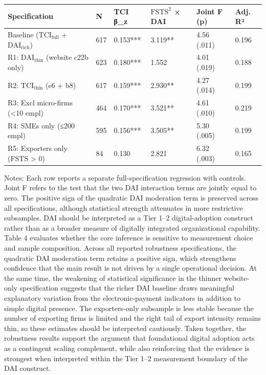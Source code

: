 \documentclass[12pt,a4paper]{article}
\begin{document}
\begin{longtable}[]{@{}llllll@{}}
\toprule\noalign{}
Specification & N & TCI β\_z & \(\mathrm{FSTS}^2\) × DAI & Joint F (p) &
Adj. R² \\
\midrule\noalign{}
\endhead
\bottomrule\noalign{}
\endlastfoot
Baseline (\(\mathrm{TCI}_{\text{full}}\) +
\(\mathrm{DAI}_{\text{rich}}\)) & 617 & 0.153*** & 3.119** & 4.56 (.011)
& 0.196 \\
R1: \(\mathrm{DAI}_{\text{thin}}\) (website c22b only) & 623 & 0.180***
& 1.552 & 4.01 (.019) & 0.188 \\
R2: \(\mathrm{TCI}_{\text{thin}}\) (e6 + b8) & 617 & 0.159*** & 2.930**
& 4.27 (.014) & 0.199 \\
R3: Excl micro-firms (\textless10 empl) & 464 & 0.170*** & 3.521** &
4.61 (.010) & 0.219 \\
R4: SMEs only (≤200 empl) & 595 & 0.156*** & 3.505** & 5.30 (.005) &
0.199 \\
R5: Exporters only (FSTS \textgreater{} 0) & 84 & 0.130 & 2.821 & 6.32
(.003) & 0.165 \\
\end{longtable}

Notes: Each row reports a separate full-specification regression with
controls. Joint F refers to the test that the two DAI interaction terms
are jointly equal to zero. The positive sign of the quadratic DAI
moderation term is preserved across all specifications, although
statistical strength attenuates in more restrictive subsamples. DAI
should be interpreted as a Tier 1--2 digital-adoption construct rather
than as a broader measure of digitally integrated organizational
capability. Table 4 evaluates whether the core inference is sensitive to
measurement choice and sample composition. Across all reported
robustness specifications, the quadratic DAI moderation term retains a
positive sign, which strengthens confidence that the main result is not
driven by a single operational decision. At the same time, the weakening
of statistical significance in the thinner website-only specification
suggests that the richer DAI baseline draws meaningful explanatory
variation from the electronic-payment indicators in addition to simple
digital presence. The exporters-only subsample is less stable because
the number of exporting firms is limited and the right tail of export
intensity remains thin, so these estimates should be interpreted
cautiously. Taken together, the robustness results support the argument
that foundational digital adoption acts as a contingent scaling
complement, while also reinforcing that the evidence is strongest when
interpreted within the Tier 1--2 measurement boundary of the DAI
construct.
\end{document}
